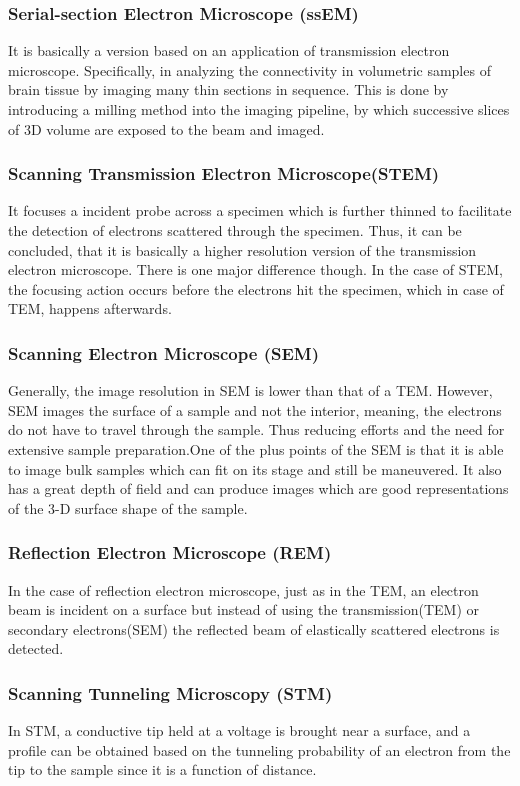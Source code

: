\documentclass[12pt]{article}
\begin{document}
\begin{normalsize}
\subsubsection{Serial-section Electron Microscope (ssEM)}
It is basically a version based on an application of transmission electron microscope. Specifically, in analyzing the connectivity in volumetric samples of brain tissue by imaging many thin sections in sequence. This is done by introducing a milling method into the imaging pipeline, by which successive slices of 3D volume are exposed to the beam and imaged.

\subsubsection{Scanning Transmission Electron Microscope(STEM)}
It focuses a incident probe across a specimen which is further thinned to facilitate the detection of electrons scattered through the specimen. Thus, it can be concluded, that it is basically a higher resolution version of the transmission electron microscope. There is one major difference though. In the case of STEM, the focusing action occurs before the electrons hit the specimen, which in case of TEM, happens afterwards.

\subsubsection{Scanning Electron Microscope (SEM)}
Generally, the image resolution in SEM is lower than that of a TEM. However, SEM images the surface of a sample and not the interior, meaning, the electrons do not have to travel through the sample. Thus reducing efforts and the need for extensive sample preparation.One of the plus points of the SEM is that it is able to image bulk samples which can fit on its stage and still be maneuvered. It also has a great depth of field and can produce images which are good representations of the 3-D surface shape of the sample.

\subsubsection{Reflection Electron Microscope (REM)}
In the case of reflection electron microscope, just as in the TEM, an electron beam is incident on a surface but instead of using the transmission(TEM) or secondary electrons(SEM) the reflected beam of elastically scattered electrons is detected.

\subsubsection{Scanning Tunneling Microscopy (STM)}
In STM, a conductive tip held at a voltage is brought near a surface, and a profile can be obtained based on the tunneling probability of an electron from the tip to the sample since it is a function of distance.


\end{normalsize}
\end{document}
